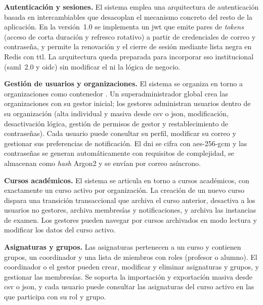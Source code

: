 \begin{functional}

  \item \textbf{Autenticación y sesiones.}
  \label{rf:auth}
  El sistema emplea una arquitectura de autenticación basada en
   intercambiables que desacoplan el mecanismo concreto
  del resto de la aplicación. En la versión~1.0 se implementa un
   \acs{jwt} que emite pares de \textit{tokens} (acceso de
  corta duración y refresco rotativo) a partir de credenciales de correo
  y contraseña, y permite la renovación y el cierre de sesión mediante
  lista negra en Redis con \acs{ttl}. La arquitectura queda preparada
  para incorporar \acs{sso} institucional (\acs{saml}~2.0 y \acs{oidc})
  sin modificar el  ni la lógica de negocio.

  \item \textbf{Gestión de usuarios y organizaciones.}
  \label{rf:users}
  El sistema se organiza en torno a organizaciones como contenedor
  . Un superadministrador global crea las
  organizaciones con su gestor inicial; los gestores administran
  usuarios dentro de su organización (alta individual y masiva desde
  \acs{csv} o \acs{json}, modificación, desactivación lógica, gestión
  de permisos de gestor y restablecimiento de contraseñas). Cada
  usuario puede consultar su perfil, modificar su correo y gestionar
  sus preferencias de notificación. El \acs{dni} se cifra con
  \acs{aes}-256-\acs{gcm} y las contraseñas se generan automáticamente
  con requisitos de complejidad, se almacenan como \textit{hash}
  Argon2 y se envían por correo asíncrono.

  \item \textbf{Cursos académicos.}
  \label{rf:courses}
  El sistema se articula en torno a cursos académicos, con exactamente
  un curso activo por organización. La creación de un nuevo curso
  dispara una transición transaccional que archiva el curso anterior,
  desactiva a los usuarios no gestores, archiva membresías y
  notificaciones, y archiva las instancias de examen. Los gestores
  pueden navegar por cursos archivados en modo lectura y modificar los
  datos del curso activo.

  \item \textbf{Asignaturas y grupos.}
  \label{rf:subjects}
  Las asignaturas pertenecen a un curso y contienen grupos, un
  coordinador y una lista de miembros con roles (profesor o alumno). El
  coordinador o el gestor pueden crear, modificar y eliminar asignaturas
  y grupos, y gestionar las membresías. Se soporta la importación y
  exportación masiva desde \acs{csv} o \acs{json}, y cada usuario puede
  consultar las asignaturas del curso activo en las que participa con su
  rol y grupo.


\end{functional}
